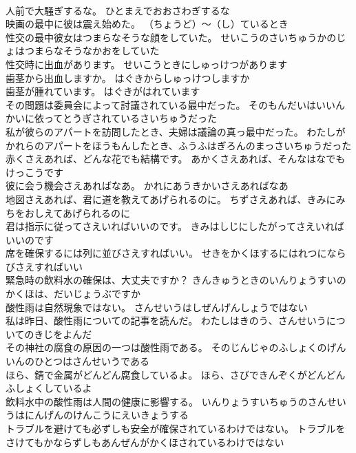 \documentclass[8pt]{extreport}
\begin{document}
\begin{CJK}{UTF8}{min}
\\	人前で大騒ぎするな。	ひとまえでおおさわぎするな 
\\	映画の最中に彼は震え始めた。	（ちょうど）～（し）ているとき
\\	性交の最中彼女はつまらなそうな顔をしていた。	せいこうのさいちゅうかのじょはつまらなそうなかおをしていた 
\\	性交時に出血があります。	せいこうときにしゅっけつがあります 
\\	歯茎から出血しますか。	はぐきからしゅっけつしますか 
\\	歯茎が腫れています。	はぐきがはれています 
\\	その問題は委員会によって討議されている最中だった。	そのもんだいはいいんかいに依ってとうぎされているさいちゅうだった 
\\	私が彼らのアパートを訪問したとき、夫婦は議論の真っ最中だった。	わたしがかれらのアパートをほうもんしたとき、ふうふはぎろんのまっさいちゅうだった 
\\	赤くさえあれば、どんな花でも結構です。	あかくさえあれば、そんなはなでもけっこうです 
\\	彼に会う機会さえあればなあ。	かれにあうきかいさえあればなあ 
\\	地図さえあれば、君に道を教えてあげられるのに。	ちずさえあれば、きみにみちをおしえてあげられるのに 
\\	君は指示に従ってさえいればいいのです。	きみはしじにしたがってさえいればいいのです 
\\	席を確保するには列に並びさえすればいい。	せきをかくほするにはれつにならびさえすればいい 
\\	緊急時の飲料水の確保は、大丈夫ですか？	きんきゅうときのいんりょうすいのかくほは、だいじょうぶですか 
\\	酸性雨は自然現象ではない。	さんせいうはしぜんげんしょうではない 
\\	私は昨日、酸性雨についての記事を読んだ。	わたしはきのう、さんせいうについてのきじをよんだ 
\\	その神社の腐食の原因の一つは酸性雨である。	そのじんじゃのふしょくのげんいんのひとつはさんせいうである 
\\	ほら、錆で金属がどんどん腐食しているよ。	ほら、さびできんぞくがどんどんふしょくしているよ 
\\	飲料水中の酸性雨は人間の健康に影響する。	いんりょうすいちゅうのさんせいうはにんげんのけんこうにえいきょうする 
\\	トラブルを避けても必ずしも安全が確保されているわけではない。	トラブルをさけてもかならずしもあんぜんがかくほされているわけではない 

\end{CJK}
\end{document}
